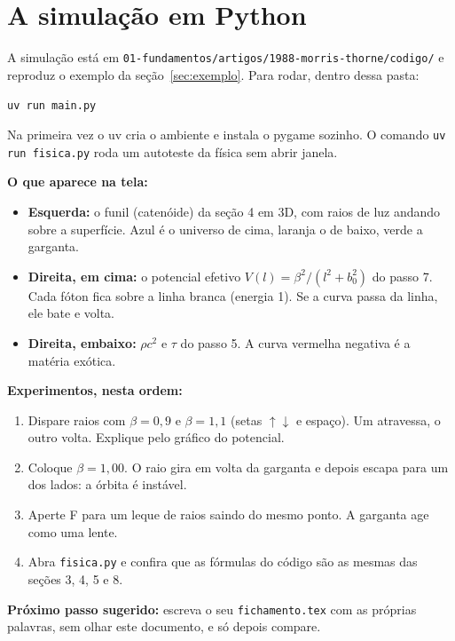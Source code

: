 \documentclass[11pt,a4paper]{article}
\begin{document}
\section{A simulação em Python}

A simulação está em \texttt{01-fundamentos/artigos/1988-morris-thorne/codigo/} e reproduz o exemplo da seção~\ref{sec:exemplo}. Para
rodar, dentro dessa pasta:
\begin{center}
\texttt{uv run main.py}
\end{center}
Na primeira vez o uv cria o ambiente e instala o pygame sozinho. O comando \texttt{uv run fisica.py} roda um autoteste
da física sem abrir janela.

\textbf{O que aparece na tela:}
\begin{itemize}[nosep]
\item \textbf{Esquerda:} o funil (catenóide) da seção 4 em 3D, com raios de luz andando sobre a superfície. Azul é o
universo de cima, laranja o de baixo, verde a garganta.
\item \textbf{Direita, em cima:} o potencial efetivo $V(l) = \beta^2/(l^2 + b_0^2)$ do passo 7. Cada fóton fica sobre
a linha branca (energia 1). Se a curva passa da linha, ele bate e volta.
\item \textbf{Direita, embaixo:} $\rho c^2$ e $\tau$ do passo 5. A curva vermelha negativa é a matéria exótica.
\end{itemize}

\textbf{Experimentos, nesta ordem:}
\begin{enumerate}[nosep]
\item Dispare raios com $\beta = 0{,}9$ e $\beta = 1{,}1$ (setas $\uparrow\downarrow$ e espaço). Um atravessa, o outro
volta. Explique pelo gráfico do potencial.
\item Coloque $\beta = 1{,}00$. O raio gira em volta da garganta e depois escapa para um dos lados: a órbita é instável.
\item Aperte F para um leque de raios saindo do mesmo ponto. A garganta age como uma lente.
\item Abra \texttt{fisica.py} e confira que as fórmulas do código são as mesmas das seções 3, 4, 5 e 8.
\end{enumerate}

\textbf{Próximo passo sugerido:} escreva o seu \texttt{fichamento.tex} com as próprias palavras, sem olhar este
documento, e só depois compare.
\end{document}
